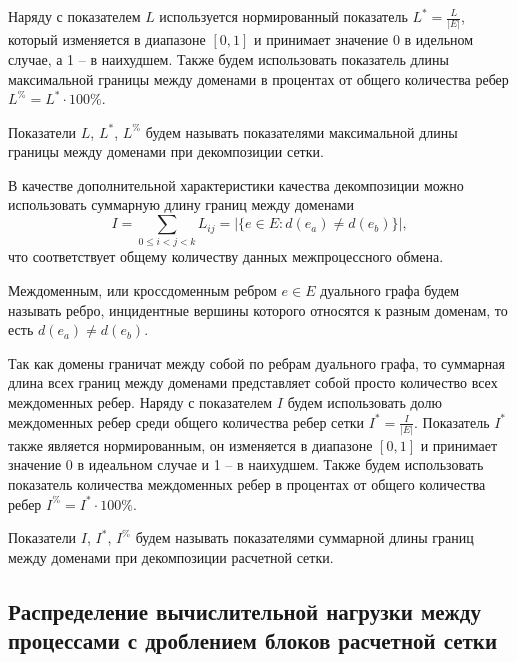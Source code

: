 Наряду с показателем $L$ используется нормированный показатель $L^{*} = \frac{L}{|E|}$, который изменяется в диапазоне $[0, 1]$ и принимает значение 0 в идельном случае, а 1 -- в наихудшем.
Также будем использовать показатель длины максимальной границы между доменами в процентах от общего количества ребер $L^{\%} = L^{*} \cdot 100\%$.

\begin{definition}
Показатели $L$, $L^{*}$, $L^{\%}$ будем называть показателями максимальной длины границы между доменами при декомпозиции сетки.
\end{definition}

В качестве дополнительной характеристики качества декомпозиции можно использовать суммарную длину границ между доменами
\begin{equation}
	I = \sum_{0 \le i < j < k}{L_{ij}} = |\{ e \in E : d(e_a) \ne d(e_b) \}|,
\end{equation}
что соответствует общему количеству данных межпроцессного обмена.

\begin{definition}
Междоменным, или кроссдоменным ребром $e \in E$ дуального графа будем называть ребро, инцидентные вершины которого относятся к разным доменам, то есть $d(e_a) \ne d(e_b)$.
\end{definition}

Так как домены граничат между собой по ребрам дуального графа, то суммарная длина всех границ между доменами представляет собой просто количество всех междоменных ребер.
Наряду с показателем $I$ будем использовать долю междоменных ребер среди общего количества ребер сетки $I^{*} = \frac{I}{|E|}$.
Показатель $I^{*}$ также является нормированным, он изменяется в диапазоне $[0, 1]$ и принимает значение 0 в идеальном случае и 1 -- в наихудшем.
Также будем использовать показатель количества междоменных ребер в процентах от общего количества ребер $I^{\%} = I^{*} \cdot 100\%$.

\begin{definition}
Показатели $I$, $I^{*}$, $I^{\%}$ будем называть показателями суммарной длины границ между доменами при декомпозиции расчетной сетки.
\end{definition}


\subsection{Распределение вычислительной нагрузки между \mbox{процессами} с дроблением блоков расчетной сетки}

